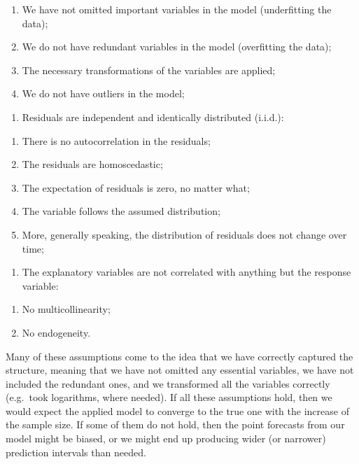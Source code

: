 \documentclass[
]{book}
\providecommand{\tightlist}{%
  \setlength{\itemsep}{0pt}\setlength{\parskip}{0pt}}
\theoremstyle{definition}
\theoremstyle{definition}
\theoremstyle{definition}
\theoremstyle{definition}
\theoremstyle{remark}
\begin{document}
\begin{enumerate}
\def\labelenumi{\alph{enumi}.}
\tightlist
\item
  We have not omitted important variables in the model (underfitting the data);
\item
  We do not have redundant variables in the model (overfitting the data);
\item
  The necessary transformations of the variables are applied;
\item
  We do not have outliers in the model;
\end{enumerate}

\begin{enumerate}
\def\labelenumi{\arabic{enumi}.}
\setcounter{enumi}{1}
\tightlist
\item
  Residuals are independent and identically distributed (i.i.d.):
\end{enumerate}

\begin{enumerate}
\def\labelenumi{\alph{enumi}.}
\tightlist
\item
  There is no autocorrelation in the residuals;
\item
  The residuals are homoscedastic;
\item
  The expectation of residuals is zero, no matter what;
\item
  The variable follows the assumed distribution;
\item
  More, generally speaking, the distribution of residuals does not change over time;
\end{enumerate}

\begin{enumerate}
\def\labelenumi{\arabic{enumi}.}
\setcounter{enumi}{2}
\tightlist
\item
  The explanatory variables are not correlated with anything but the response variable:
\end{enumerate}

\begin{enumerate}
\def\labelenumi{\alph{enumi}.}
\tightlist
\item
  No multicollinearity;
\item
  No endogeneity.
\end{enumerate}

Many of these assumptions come to the idea that we have correctly captured the structure, meaning that we have not omitted any essential variables, we have not included the redundant ones, and we transformed all the variables correctly (e.g.~took logarithms, where needed). If all these assumptions hold, then we would expect the applied model to converge to the true one with the increase of the sample size. If some of them do not hold, then the point forecasts from our model might be biased, or we might end up producing wider (or narrower) prediction intervals than needed.
\end{document}
